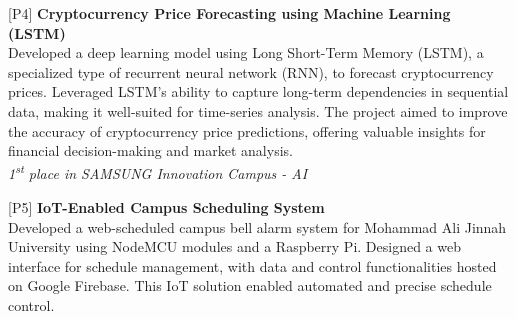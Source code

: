 \begin{cventries}
\begin{rSection}{}
    {\hspace{-1.5em}[P4]\hspace{1em}}{\bodyfont\bfseries\color{darktext} {Cryptocurrency Price Forecasting using Machine Learning (LSTM) \hspace{1em} \href{https://www.datacamp.com/datalab/w/59d76458-67c7-4a1f-bbcf-b8adb52c171e#cryptocurrency-price-forecasting-using-machine-learning-lstm} {\Large{\faLaptop}}}}
    \\\hspace{1.2em}Developed a deep learning model using Long Short-Term Memory (LSTM), a specialized type of recurrent neural network (RNN), to forecast cryptocurrency prices. Leveraged LSTM's ability to capture long-term dependencies in sequential data, making it well-suited for time-series analysis. The project aimed to improve the accuracy of cryptocurrency price predictions, offering valuable insights for financial decision-making and market analysis.
    \\  \hspace{0.5em} \emph{1\textsuperscript{st} place in SAMSUNG Innovation Campus - AI}
    \vspace{-0.2em}
    \end{rSection}
\begin{rSection}{}
{\hspace{-1.5em}[P5]\hspace{1em}}{\bodyfont\bfseries\color{darktext} {IoT-Enabled Campus Scheduling System \hspace{1em} \href{https://maju-iot.web.app/}{\large{\faGlobe}}}}
\\\hspace{1.2em}Developed a web-scheduled campus bell alarm system for Mohammad Ali Jinnah University using NodeMCU modules and a Raspberry Pi. Designed a web interface for schedule management, with data and control functionalities hosted on Google Firebase. This IoT solution enabled automated and precise schedule control.
\end{rSection}

\end{cventries}